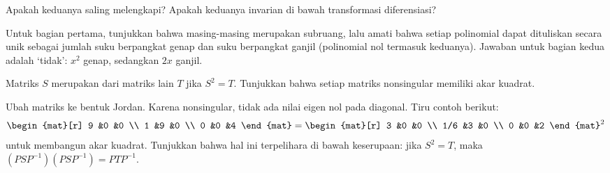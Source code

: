 \begin{exercises}
    Apakah keduanya saling melengkapi?
    Apakah keduanya invarian di bawah transformasi diferensiasi?
    \begin{answer}
      Untuk bagian pertama, tunjukkan bahwa masing-masing merupakan subruang,
      lalu amati bahwa setiap polinomial dapat dituliskan secara unik
       sebagai jumlah suku berpangkat genap dan suku berpangkat ganjil (polinomial
       nol termasuk keduanya).
       Jawaban untuk bagian kedua adalah `tidak': \( x^2 \) genap, sedangkan
       \( 2x \) ganjil.
     \end{answer}
   \item 
     Matriks \( S \) merupakan 
     dari matriks lain \( T \) jika \( S^2=T \).
     Tunjukkan bahwa setiap matriks nonsingular memiliki akar kuadrat.
     \begin{answer}
         Ubah matriks ke bentuk Jordan.
         Karena nonsingular, tidak ada nilai eigen nol pada diagonal.
         Tiru contoh berikut:
          \begin{equation*}
             \begin{mat}[r]
                9  &0  &0 \\
                1  &9  &0 \\
                0  &0  &4
             \end{mat}
             =
             \begin{mat}[r]
                3  &0  &0 \\
               1/6 &3  &0 \\
                0  &0  &2
             \end{mat}^2
          \end{equation*}
         untuk membangun akar kuadrat.
         Tunjukkan bahwa hal ini terpelihara di bawah keserupaan: jika \( S^2=T \), maka
         \( (PSP^{-1})(PSP^{-1})=PTP^{-1} \). 
    \end{answer}
\end{exercises}

